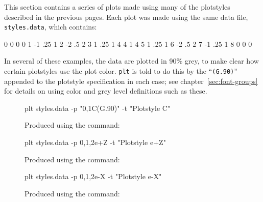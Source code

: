 \documentclass{book}
\begin{document}
This section contains a series of plots made using many of the plotstyles
described in the previous pages.  Each plot was made using the same data
file, {\tt styles.data}, which contains:

\begin{center}
\begin{boxedverbatim}
0 0 0 0
1 -1 .25 1
2 -2 .5 2
3 1 .25 1
4 4 1 4
5 1 .25 1
6 -2 .5 2
7 -1 .25 1
8 0 0 0
\end{boxedverbatim}
\end{center}

In several of these examples, the data are plotted in 90\% grey, to make clear
how certain plotstyles use the plot color.  {\tt plt} is told to do this by
the ``{\tt (G.90)}'' appended to the plotstyle specification in each case;  see
chapter~\ref{sec:font-groups} for details on using color and grey level
definitions such as these.

\begin{figure}[h]
\begin{center}
\end{center}
\caption[Plotstyle C]{Produced using the command:
\label{fig:style-C}}
\begin{center}
\begin{boxedverbatim}
plt styles.data -p "0,1C(G.90)" -t "Plotstyle C"
\end{boxedverbatim}
\end{center}
\end{figure}

\begin{figure}
\begin{center}
\end{center}
\caption[Plotstyle e+Z]{Produced using the command:
\label{fig:style-e+Z}}
\begin{center}
\begin{boxedverbatim}
plt styles.data -p 0,1,2e+Z -t "Plotstyle e+Z"
\end{boxedverbatim}
\end{center}
\end{figure}

\begin{figure}
\begin{center}
\end{center}
\caption[Plotstyle e-X]{Produced using the command:
\label{fig:style-e-X}}
\begin{center}
\begin{boxedverbatim}
plt styles.data -p 0,1,2e-X -t "Plotstyle e-X"
\end{boxedverbatim}
\end{center}
\end{figure}
\end{document}
